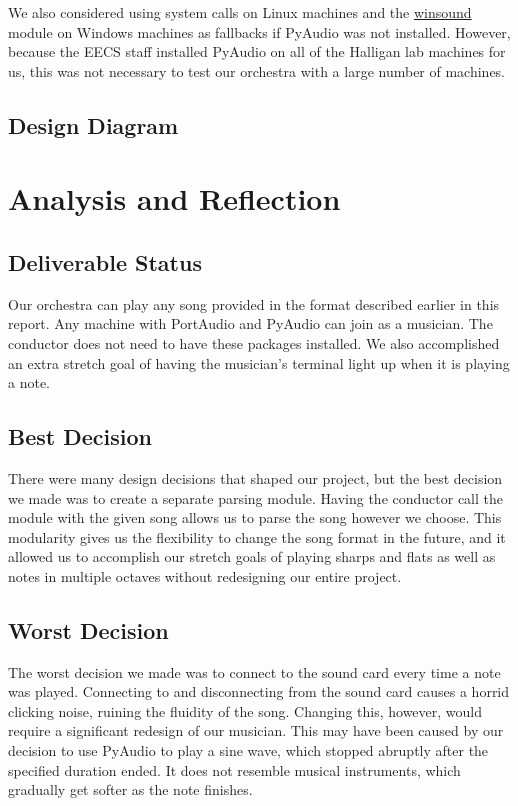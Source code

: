 \documentclass[12pt, letterpaper]{article}
\begin{document}
We also considered using system calls on Linux machines and the
\href{https://docs.python.org/2/library/winsound.html}{winsound} module on Windows machines as
fallbacks if PyAudio was not installed. However, because the EECS staff installed PyAudio on all of
the Halligan lab machines for us, this was not necessary to test our orchestra with a large number
of machines.


\subsection{Design Diagram}


\section{Analysis and Reflection}

\subsection{Deliverable Status}
Our orchestra can play any song provided in the format described earlier in this report. Any machine
with PortAudio and PyAudio can join as a musician. The conductor does not need to have these
packages installed. We also accomplished an extra stretch goal of having the musician's terminal
light up when it is playing a note.

\subsection{Best Decision}
There were many design decisions that shaped our project, but the best decision we made was to
create a separate parsing module. Having the conductor call the module with the given song allows
us to parse the song however we choose. This modularity gives us the flexibility to change the
song format in the future, and it allowed us to accomplish our stretch goals of playing sharps and
flats as well as notes in multiple octaves without redesigning our entire project.

\subsection{Worst Decision}
The worst decision we made was to connect to the sound card every time a note was played.
Connecting to and disconnecting from the sound card causes a horrid clicking noise, ruining the
fluidity of the song. Changing this, however, would require a significant redesign of our musician.
This may have been caused by our decision to use PyAudio to play a sine wave, which stopped abruptly
after the specified duration ended. It does not resemble musical instruments, which gradually get
softer as the note finishes.
\end{document}
